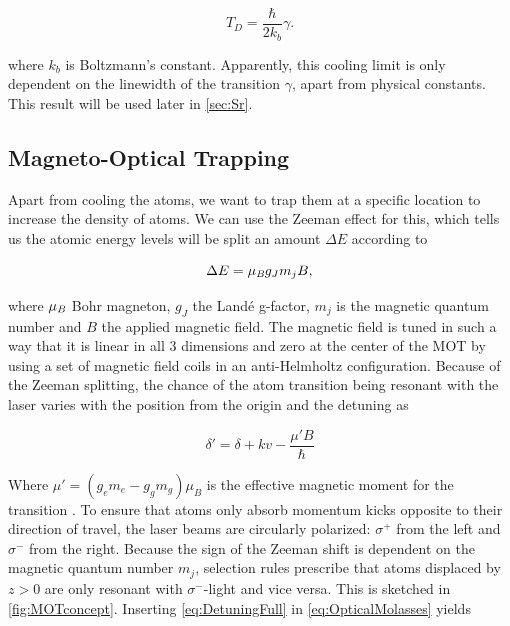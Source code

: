 \begin{equation}\label{eq:DopplerTemperature}
	T_D = \frac{\hbar}{2k_b} \gamma.
\end{equation}

where $k_b$ is Boltzmann's constant. Apparently, this cooling limit is only dependent on the linewidth of the transition $\gamma$, apart from physical constants. This result will be used later in \cref{sec:Sr}.

\subsection{Magneto-Optical Trapping}

Apart from cooling the atoms, we want to trap them at a specific location to increase the density of atoms. 
We can use the Zeeman effect for this, which tells us the atomic energy levels will be split an amount $\Delta E$ according to \cite{Griffiths2004}

\begin{equation}\label{eq:Zeeman}
	\Delta E = \mu_{\emph{B}} g_J m_j B,
\end{equation}

where $\mu_{\emph{B}}$ Bohr magneton, $g_J$ the Landé g-factor, $m_j$ is the magnetic quantum number and $B$ the applied magnetic field. 
The magnetic field is tuned in such a way that it is linear in all 3 dimensions and zero at the center of the \ac{MOT} by using a set of magnetic field coils in an anti-Helmholtz configuration. 
Because of the Zeeman splitting, the chance of the atom transition being resonant with the laser varies with the position from the origin and the detuning as \cite{Kowalski2010}

\begin{equation}\label{eq:DetuningFull}
	\delta' = \delta + k v - \frac{\mu'B}{\hbar}
\end{equation}

Where $\mu' = (g_e m_e-g_g m_g)\mu_B$ is the effective magnetic moment for the transition \cite{Kowalski2010}. 
To ensure that atoms only absorb momentum kicks opposite to their direction of travel, the laser beams are circularly polarized: $\sigma^+$ from the left and $\sigma^-$ from the right. Because the sign of the Zeeman shift is dependent on the magnetic quantum number $m_j$, selection rules prescribe that atoms displaced by $z>0$ are only resonant with $\sigma^-$-light and vice versa.
This is sketched in \cref{fig:MOTconcept}. Inserting \cref{eq:DetuningFull} in \cref{eq:OpticalMolasses} yields


